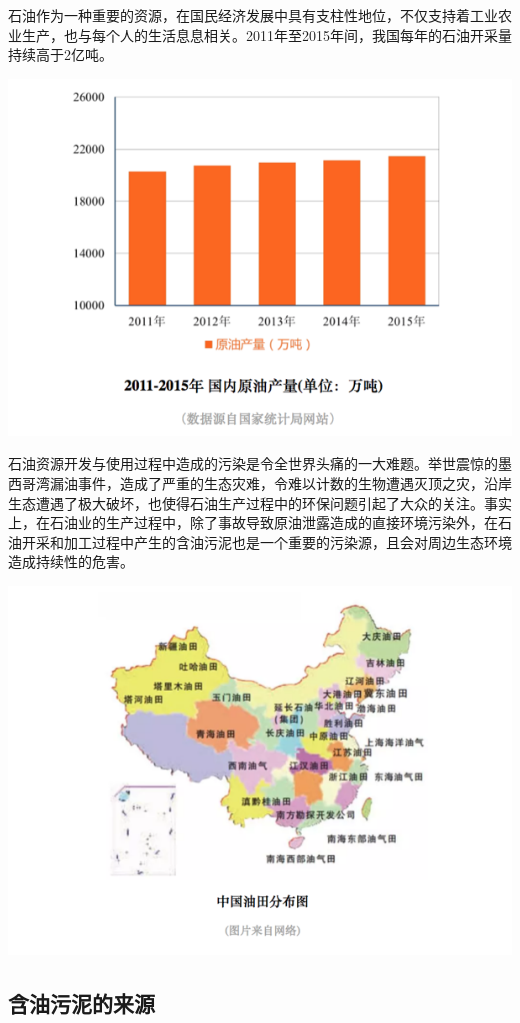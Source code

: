 \documentclass[]{book}
\begin{document}
石油作为一种重要的资源，在国民经济发展中具有支柱性地位，不仅支持着工业农业生产，也与每个人的生活息息相关。2011年至2015年间，我国每年的石油开采量持续高于2亿吨。

\includegraphics[width=8.33in]{images/youni1}

石油资源开发与使用过程中造成的污染是令全世界头痛的一大难题。举世震惊的墨西哥湾漏油事件，造成了严重的生态灾难，令难以计数的生物遭遇灭顶之灾，沿岸生态遭遇了极大破坏，也使得石油生产过程中的环保问题引起了大众的关注。事实上，在石油业的生产过程中，除了事故导致原油泄露造成的直接环境污染外，在石油开采和加工过程中产生的含油污泥也是一个重要的污染源，且会对周边生态环境造成持续性的危害。

\includegraphics[width=8.33in]{images/youni2}

\subsection{含油污泥的来源}
\end{document}
